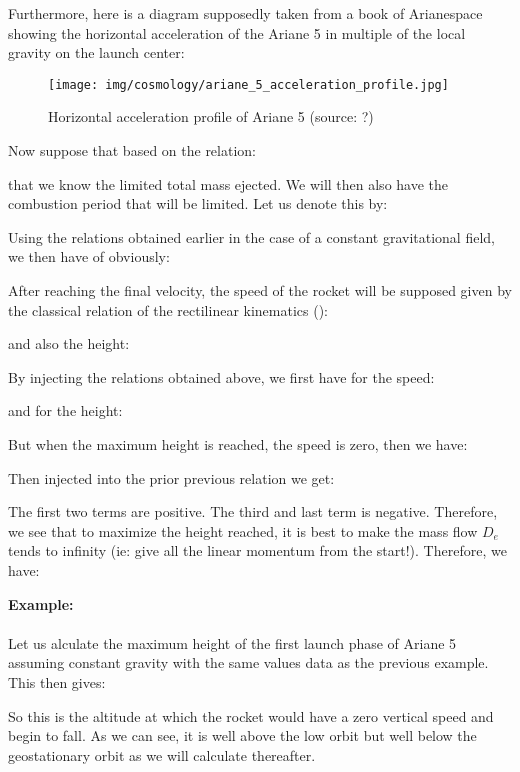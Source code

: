 	Furthermore, here is a diagram supposedly taken from a book of Arianespace showing the horizontal acceleration of the Ariane 5 in multiple of the local gravity on the launch center:
	\begin{figure}[H]
		\centering
		\texttt{[image: img/cosmology/ariane\_5\_acceleration\_profile.jpg]}
		\caption[Horizontal acceleration profile of Ariane 5]{Horizontal acceleration profile of Ariane 5 (source: ?)}
	\end{figure}
	Now suppose that based on the relation:
	
	that we know the limited total mass ejected. We will then also have the combustion period that will be limited. Let us denote this by:
	
	Using the relations obtained earlier in the case of a constant gravitational field, we then have of obviously:
	
	After reaching the final velocity, the speed of the rocket will be supposed given by the classical relation of the rectilinear kinematics ():
	
	and also the height:
	
	By injecting the relations obtained above, we first have for the speed:
	
	and for the height:
	
	But when the maximum height is reached, the speed is zero, then we have:
	
	Then injected into the prior previous relation we get:
	
	The first two terms are positive. The third and last term is negative. Therefore, we see that to maximize the height reached, it is best to make the mass flow $D_e$ tends to infinity (ie: give all the linear momentum from the start!). Therefore, we have:
	
	\begin{tcolorbox}[colframe=black,colback=white,sharp corners]
	\textbf{{\Large {}}Example:}\\\\
	Let us alculate the maximum height of the first launch phase of Ariane 5 assuming constant gravity with the same values data as the previous example. This then gives:
	
	So this is the altitude at which the rocket would have a zero vertical speed and begin to fall. As we can see, it is well above the low orbit but well below the geostationary orbit as we will calculate thereafter.
	\end{tcolorbox}
	

